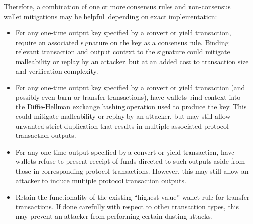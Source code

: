 \documentclass{article}
\begin{document}
Therefore, a combination of one or more consensus rules and non-consensus wallet mitigations may be helpful, depending on exact implementation:
\begin{itemize}
	\item For any one-time output key specified by a convert or yield transaction, require an associated signature on the key as a consensus rule.
	Binding relevant transaction and output context to the signature could mitigate malleability or replay by an attacker, but at an added cost to transaction size and verification complexity.
	\item For any one-time output key specified by a convert or yield transaction (and possibly even burn or transfer transactions), have wallets bind context into the Diffie-Hellman exchange hashing operation used to produce the key.
	This could mitigate malleability or replay by an attacker, but may still allow unwanted strict duplication that results in multiple associated protocol transaction outputs.
	\item For any one-time output specified by a convert or yield transaction, have wallets refuse to present receipt of funds directed to such outputs aside from those in corresponding protocol transactions.
	However, this may still allow an attacker to induce multiple protocol transaction outputs.
	\item Retain the functionality of the existing ``highest-value'' wallet rule for transfer transactions.
	If done carefully with respect to other transaction types, this may prevent an attacker from performing certain dusting attacks.
\end{itemize}
\end{document}
